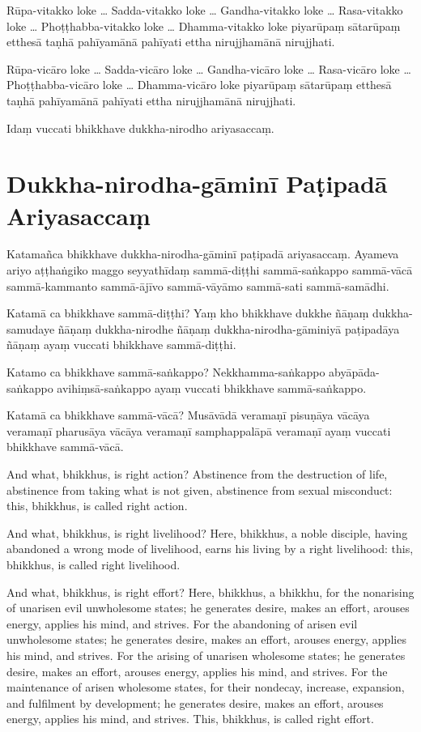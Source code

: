 \paliPage

Rūpa-vitakko loke \ldots{} Sadda-vitakko loke \ldots{} Gandha-vitakko loke \ldots{}
Rasa-vitakko loke \ldots{} Phoṭṭhabba-vitakko loke \ldots{} Dhamma-vitakko loke
piyarūpaṃ sātarūpaṃ etthesā taṇhā pahīyamānā pahīyati ettha nirujjhamānā
nirujjhati.

Rūpa-vicāro loke \ldots{} Sadda-vicāro loke \ldots{} Gandha-vicāro loke \ldots{}
Rasa-vicāro loke \ldots{} Phoṭṭhabba-vicāro loke \ldots{} Dhamma-vicāro loke
piyarūpaṃ sātarūpaṃ etthesā taṇhā pahīyamānā pahīyati ettha nirujjhamānā
nirujjhati.

Idaṃ vuccati bhikkhave dukkha-nirodho ariyasaccaṃ.

\section*{Dukkha-nirodha-gāminī Paṭipadā Ariyasaccaṃ}

Katamañca bhikkhave dukkha-nirodha-gāminī paṭipadā ariyasaccaṃ. Ayameva ariyo
aṭṭhaṅgiko maggo seyyathīdaṃ sammā-diṭṭhi sammā-saṅkappo sammā-vācā sammā-kammanto
sammā-ājīvo sammā-vāyāmo sammā-sati sammā-samādhi.

Katamā ca bhikkhave sammā-diṭṭhi? Yaṃ kho bhikkhave dukkhe ñāṇaṃ dukkha-samudaye
ñāṇaṃ dukkha-nirodhe ñāṇaṃ dukkha-nirodha-gāminiyā paṭipadāya ñāṇaṃ ayaṃ vuccati
bhikkhave sammā-diṭṭhi.

Katamo ca bhikkhave sammā-saṅkappo? Nekkhamma-saṅkappo abyāpāda-saṅkappo
avihiṃsā-saṅkappo ayaṃ vuccati bhikkhave sammā-saṅkappo.

Katamā ca bhikkhave sammā-vācā? Musāvādā veramaṇī pisuṇāya vācāya veramaṇī
pharusāya vācāya veramaṇī samphappalāpā veramaṇī ayaṃ vuccati bhikkhave
sammā-vācā.

\englishPage

And what, bhikkhus, is right action? Abstinence from the destruction of life,
abstinence from taking what is not given, abstinence from sexual misconduct:
this, bhikkhus, is called right action.

And what, bhikkhus, is right livelihood? Here, bhikkhus, a noble disciple,
having abandoned a wrong mode of livelihood, earns his living by a right
livelihood: this, bhikkhus, is called right livelihood.

And what, bhikkhus, is right effort? Here, bhikkhus, a bhikkhu, for the
nonarising of unarisen evil unwholesome states; he generates desire, makes an
effort, arouses energy, applies his mind, and strives. For the abandoning of
arisen evil unwholesome states; he generates desire, makes an effort, arouses
energy, applies his mind, and strives. For the arising of unarisen wholesome
states; he generates desire, makes an effort, arouses energy, applies his mind,
and strives. For the maintenance of arisen wholesome states, for their nondecay,
increase, expansion, and fulfilment by development; he generates desire, makes
an effort, arouses energy, applies his mind, and strives. This, bhikkhus, is
called right effort.

